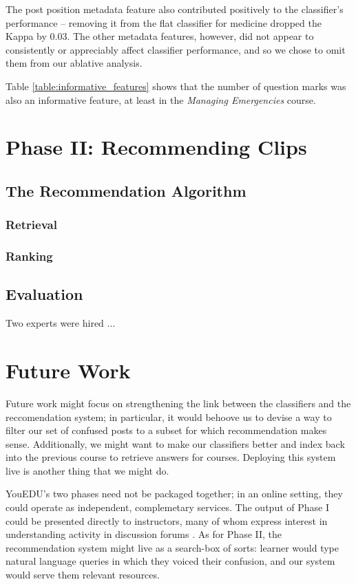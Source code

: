 \documentclass{edm_template}
\begin{document}
The post position metadata feature also contributed positively to the classifier's performance -- removing it from the flat classifier for medicine dropped the Kappa by 0.03. The other metadata features, however, did not appear to consistently or appreciably affect classifier performance, and so we chose to omit them from our ablative analysis.

Table \ref{table:informative_features} shows that the number of question marks was also an informative feature, at least in the \emph{Managing Emergencies} course. 

\section{Phase II: Recommending Clips}
\label{sec:clipRecommendation}
\subsection{The Recommendation Algorithm}
\subsubsection{Retrieval}
\subsubsection{Ranking}

\subsection{Evaluation}
Two experts were hired ...

\section{Future Work}
\label{sec:futureWork}

Future work might focus on strengthening the link between the classifiers and the reccomendation system; in particular, it would behoove us to devise a way to filter our set of confused posts to a subset for which recommendation makes sense. Additionally, we might want to make our classifiers better and index back into the previous course to retrieve answers for courses. Deploying this system live is another thing that we might do. 

YouEDU's two phases need not be packaged together; in an online setting, they could operate as independent, complemetary services. The output of Phase I could be presented directly to instructors, many of whom express interest in understanding activity in discussion forums \cite{Stephens-Martinez:2014:MMI:2556325.2566246}. As for Phase II, the recommendation system might live as a search-box of sorts: learner would type natural language queries in which they voiced their confusion, and our system would serve them relevant resources.
\end{document}
